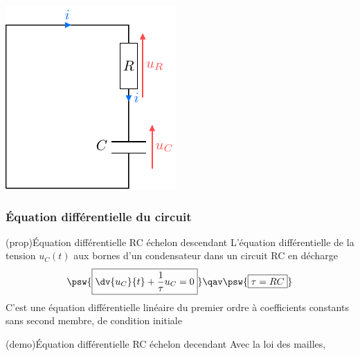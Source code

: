 \documentclass[../../main/main.tex]{subfiles}
\begin{document}
\begin{tcb*}[sidebyside, righthand ratio=.30]
\begin{center}
{			\includegraphics[width=.9\linewidth]{circ_rc-decharge}
		}%
		\label{fig:circ_rc-decharge}
	\end{center}
\end{tcb*}

\subsubsection{Équation différentielle du circuit}
\begin{tcb*}[label=prop:eqdiffrc, sidebyside,
		list entry={\lte\theprop~:~Équa. diff. RC descendant}]
	(prop){Équation différentielle RC échelon descendant}
	L'équation différentielle de la tension $u_C(t)$ aux bornes d'un
	condensateur dans un circuit RC en décharge
	\[
		\psw{%
			\boxed{\dv{u_C}{t} + \frac{1}{\tau}u_C = 0}
		}%
		\qav
		\psw{%
			\boxed{\tau = RC}
		}%
	\]
	\tcblower
	C'est une équation différentielle linéaire du premier ordre à
	coefficients constants sans second membre, de condition initiale
	\psw{%
		\[ \boxed{u_C(0^-) = u_C(0^+) = E}\]
	}%
\end{tcb*}
\begin{tcb*}[label=demo:eqdiffrc,
		list entry={\lte\thedemo~:~Équa. diff. RC descendant}]
	(demo){Équation différentielle RC échelon decendant}
	Avec la loi des mailles,
	\vspace{-25pt}
\end{tcb*}
\end{document}
